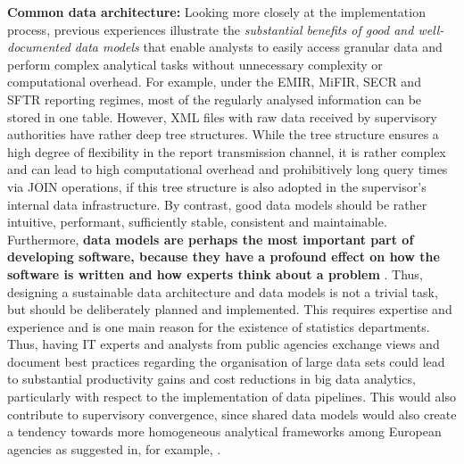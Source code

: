 \documentclass[a4paper, 11pt]{report}
\begin{document}
\textbf{Common data architecture:} Looking more closely at the implementation process, previous experiences illustrate the \emph{substantial benefits of good and well-documented data models} that enable analysts to easily access granular data and perform complex analytical tasks without unnecessary complexity or computational overhead. For example, under the EMIR, MiFIR, SECR and SFTR reporting regimes, most of the regularly analysed information can be stored in one table. However, XML files with raw data received by supervisory authorities have rather deep tree structures. While the tree structure ensures a high degree of flexibility in the report transmission channel, it is rather complex and can lead to high computational overhead and prohibitively long query times via JOIN operations, if this tree structure is also adopted in the supervisor's internal data infrastructure. By contrast, good data models should be rather intuitive, performant, sufficiently stable, consistent and maintainable. Furthermore, \textbf{data models are perhaps the most important part of developing software, because they have a profound effect on how the software is written and how experts think about a problem} \parencite[p.~27]{Kleppmann.2017}. Thus, designing a sustainable data architecture and data models is not a trivial task, but should be deliberately planned and implemented. This requires expertise and experience and is one main reason for the existence of statistics departments. Thus, having IT experts and analysts from public agencies exchange views and document best practices regarding the organisation of large data sets could lead to substantial productivity gains and cost reductions in big data analytics, particularly with respect to the implementation of data pipelines. This would also contribute to supervisory convergence, since shared data models would also create a tendency towards more homogeneous analytical frameworks among European agencies as suggested in, for example, \textcite{Gentilini.2026}.
\end{document}
